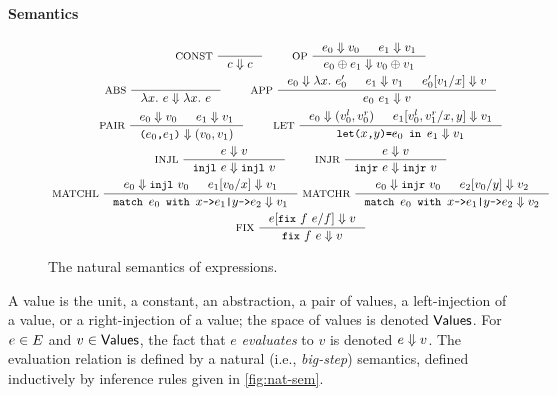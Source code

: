 \paragraph{Semantics}
%
\begin{figure}
  \centering
  \begin{gather*}
  \inference[ CONST ]{ }{ c \evalsto c } \qquad
  \inference[ OP ]{ %
    e_0 \evalsto v_0 & %
    e_1 \evalsto v_1 } %
  { e_0 \oplus e_1 \evalsto v_0 \oplus v_1 } \\
  \inference[ ABS ]{ }{ \lambda x.\ e \evalsto \lambda x.\ e } \qquad
  \inference[ APP ]{ %
    e_0 \evalsto \lambda x.\ e_0' & %
    e_1 \evalsto v_1 &
    \replace{ e_0' }{ x }{ v_1 } \evalsto v }{ %
    e_0\ e_1 \evalsto v } \\
  \inference[ PAIR ]{ %
    e_0 \evalsto v_0 & e_1 \evalsto v_1 }{ %
    \pair{ e_0 }{ e_1 } \evalsto (v_0, v_1) } \qquad
  \inference[ LET ]{
    e_0 \evalsto (v_0^l, v_0^r) &
    \replace{ e_1 }{ x, y }{ v_0^l, v_1^r } \evalsto v_1 }{ %
    \letexp{x}{y}{e_0}{e_1} \evalsto v_1 } \\
  \inference[ INJL ]{ e \evalsto v }{ %
    \injl\ e \evalsto \injl\ v } \qquad
  \inference[ INJR ]{ e \evalsto v }{ \injr\ e \evalsto \injr\ v } \\
  \inference[ MATCHL ]{
    e_0 \evalsto \injl\ v_0 &
    \replace{ e_1 }{ x }{ v_0 } \evalsto v_1 }{ %
    \matchexp{ e_0 }{ x }{ e_1 }{ y }{ e_2 } \evalsto v_1 }
  \inference[ MATCHR ]{
    e_0 \evalsto \injr\ v_0 &
    \replace{ e_2 }{ y }{ v_0 } \evalsto v_2 }{ %
    \matchexp{ e_0 }{ x }{ e_1 }{ y }{ e_2 } \evalsto v_2 } \\
  \inference[ FIX ]{ \replace{e}{ f }{ \fix{ f }{ e } } \evalsto v } %
  { \fix{ f }{ e } \evalsto v }
  \end{gather*}
  \caption{The natural semantics of expressions.}
  \label{fig:nat-sem}
\end{figure}
%
A value is the unit, a constant, an abstraction, a pair of values, a
left-injection of a value, or a right-injection of a value;
%
the space of values is denoted $\mathsf{Values}$.
%
For $e \in E$ and $v \in \mathsf{Values}$, the fact that $e$
\emph{evaluates} to $v$ is denoted $e \Downarrow v$.
% 
The evaluation relation is defined by a natural (i.e.,
\emph{big-step}) semantics, defined inductively by inference rules
given in \autoref{fig:nat-sem}.


